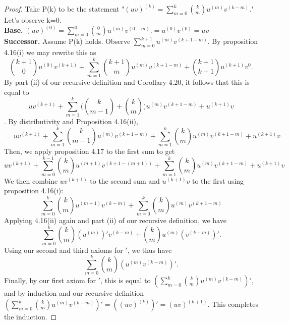 \documentclass[12pt]{amsart}
\begin{document}
\begin{proof}
	Take P(k) to be the statement "$(uv)^{(k)} = \sum_{m=0}^{k} {{k}\choose{m}} u^{(m)}v^{(k-m)}.$" Let's observe k=0.
	\\\textbf{Base.} $(uv)^{(0)} = \sum_{m=0}^{0} {{0}\choose{m}} u^{(m)}v^{(0-m)}. = u^{(0)}v^{(0)} = uv$
	\\\textbf{Successor.} Assume P(k) holds. Observe $\sum\limits_{m=0}^{k+1}u^{(m)}v^{(k+1 - m)}$. By proposition 4.16(i) we may rewrite this as $${{k+1}\choose{0}}u^{(0)}v^{(k+1)} + \sum\limits_{m=1}^{k} {{k+1}\choose{m}} u^{(m)}v^{(k+1-m)} +{{k+1}\choose{k+1}} u^{(k+1)}v^{0}.$$ By part (ii) of our recursive definition and Corollary 4.20, it follows that this is equal to $$uv^{(k+1)} + \sum\limits_{m=1}^{k} \Bigg({{k}\choose{m-1}} +{{k}\choose{m}}\Bigg) u^{(m)}v^{(k+1-m)} +u^{(k+1)}v$$. By distributivity and Proposition 4.16(ii), $$ = uv^{(k+1)} + \sum\limits_{m=1}^{k} {{k}\choose{m-1}}u^{(m)}v^{(k+1-m)} + \sum\limits_{m=1}^{k}{{k}\choose{m}} u^{(m)}v^{(k+1-m)} +u^{(k+1)}v$$
	Then, we apply proposition 4.17 to the first sum to get  $$ uv^{(k+1)} + \sum\limits_{m=0}^{k-1} {{k}\choose{m}}u^{(m+1)}v^{(k+1-(m+1))} + \sum\limits_{m=1}^{k}{{k}\choose{m}} u^{(m)}v^{(k+1-m)} +u^{(k+1)}v$$
	We then combine $uv^{(k+1)}$ to the second sum and $u^{(k+1)}v$ to the first using proposition 4.16(i): $$\sum\limits_{m=0}^{k} {{k}\choose{m}}u^{(m+1)}v^{(k-m)} + \sum\limits_{m=0}^{k}{{k}\choose{m}} u^{(m)}v^{(k+1-m)}$$
	Applying 4.16(ii) again and part (ii) of our recursive definition, we have $$\sum\limits_{m=0}^{k} {{k}\choose{m}}(u^{(m)})'v^{(k-m)} + {{k}\choose{m}} u^{(m)}(v^{(k-m)})'.$$ Using our second and third axioms for $'$, we thus have $$\sum\limits_{m=0}^{k} {{k}\choose{m}}(u^{(m)}v^{(k-m)})'.$$ Finally, by our first axiom for $'$, this is equal to $(\sum\limits_{m=0}^{k} {{k}\choose{m}}u^{(m)}v^{(k-m)})'$, and by induction and our recursive definition $(\sum\limits_{m=0}^{k} {{k}\choose{m}}u^{(m)}v^{(k-m)})' = ((uv)^{(k)})' = (uv)^{(k+1)}$. This completes the induction.
\end{proof}
\end{document}
